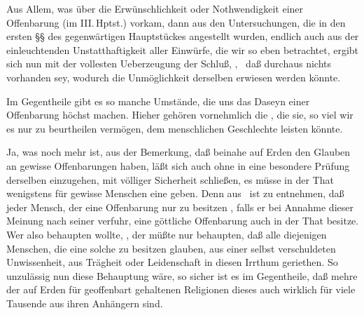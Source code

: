 \begin{aufza}
\item Aus Allem, was über die Erwünschlichkeit oder Nothwendigkeit einer Offenbarung (im III.\,Hptst.) vorkam, dann aus den Untersuchungen, die in den ersten §§ des gegenwärtigen Hauptstückes angestellt wurden, endlich auch aus der einleuchtenden Unstatthaftigkeit aller Einwürfe, die wir so eben betrachtet, ergibt sich nun mit der vollesten Ueberzeugung der Schluß, , \dh\ daß durchaus nichts vorhanden sey, wodurch die Unmöglichkeit derselben erwiesen werden könnte.
\item Im Gegentheile gibt es so manche Umstände, die uns das Daseyn einer Offenbarung höchst  machen. Hieher gehören vornehmlich die , die sie, so viel wir es nur zu beurtheilen vermögen, dem menschlichen Geschlechte leisten könnte.
\item Ja, was noch mehr ist, aus der Bemerkung, daß beinahe  auf Erden den Glauben an gewisse Offenbarungen haben, läßt sich auch ohne in eine besondere Prüfung derselben einzugehen, mit völliger Sicherheit schließen, es müsse in der That wenigstens für gewisse Menschen eine  geben. Denn aus \ ist zu entnehmen, daß jeder Mensch, der eine Offenbarung nur zu besitzen , falls er bei Annahme dieser Meinung nach seiner  verfuhr, eine göttliche Offenbarung auch in der That besitze. Wer also behaupten wollte, , der müßte nur behaupten, daß alle diejenigen Menschen, die eine solche zu besitzen glauben, aus einer selbst verschuldeten Unwissenheit, aus Trägheit oder Leidenschaft in diesen Irrthum geriethen. So unzulässig nun diese Behauptung wäre, so sicher ist es im Gegentheile, daß mehre der auf Erden für geoffenbart gehaltenen Religionen dieses auch wirklich für viele Tausende aus ihren Anhängern sind.

\end{aufza}
